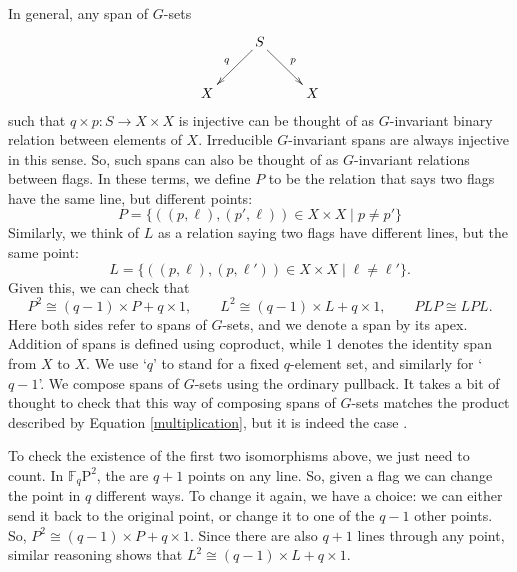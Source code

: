 \documentclass{article}
\renewcommand{\to}{\rightarrow}
\newcommand{\maps}{\colon}
\begin{document}
In general, any span of $G$-sets
\[
\xymatrix{
& S \ar[dl]_{q} \ar[dr]^{p} & \\
X & & X}
\]
such that $q \times p \maps S \to X \times X$ is injective can be
thought of as $G$-invariant binary relation between elements of $X$.
Irreducible $G$-invariant spans are always injective in this sense.
So, such spans can also be thought of as $G$-invariant relations between
flags.  In these terms, we define $P$ to be the relation that says 
two flags have the same line, but different points:
\[ P = \{((p,\ell),(p',\ell)) \in X \times X \mid p\neq p'\}
\]
Similarly, we think of $L$ as a relation saying two flags
have different lines, but the same point:
\[ L = 
\{((p,\ell),(p,\ell')) \in X \times X \mid \ell\neq \ell'\}. \]
Given this, we can check that
\[ P^2 \cong (q-1) \times P + q \times 1, \qquad L^2 \cong (q-1) \times L + 
q \times 1, \qquad PLP \cong LPL . \] 
Here both sides refer to spans of $G$-sets, and we denote a span by
its apex.  Addition of spans is defined using coproduct, while $1$
denotes the identity span from $X$ to $X$.  We use `$q$' to stand for
a fixed $q$-element set, and similarly for `$q-1$'.  We compose spans
of $G$-sets using the ordinary pullback.  It takes a bit of thought to
check that this way of composing spans of $G$-sets matches the product
described by Equation \ref{multiplication}, but it is indeed the case
\cite{Hoffnung}.

To check the existence of the first two isomorphisms above, we just
need to count.  In $\mathbb{F}_q\mathrm{P}^2$, the are $q+1$ points on any
line.  So, given a flag we can change the point in $q$ different ways.
To change it again, we have a choice: we can either send it back to
the original point, or change it to one of the $q-1$ other points.
So, $P^2 \cong (q-1) \times P + q \times 1$.  Since there are also
$q+1$ lines through any point, similar reasoning shows that $L^2 \cong
(q-1) \times L + q \times 1$.
\end{document}
